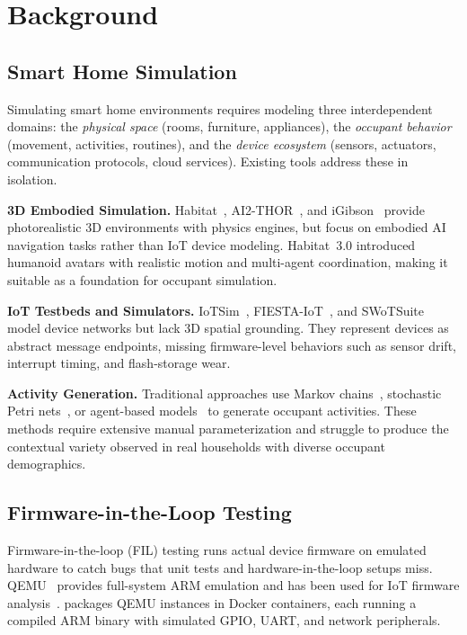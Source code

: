 \section{Background}\label{sec:background}

\subsection{Smart Home Simulation}

Simulating smart home environments requires modeling three
interdependent domains: the \emph{physical space} (rooms, furniture,
appliances), the \emph{occupant behavior} (movement, activities,
routines), and the \emph{device ecosystem} (sensors, actuators,
communication protocols, cloud services).  Existing tools address
these in isolation.

\textbf{3D Embodied Simulation.}
Habitat~\cite{habitat19iccv,habitat2,habitat3}, AI2-THOR~\cite{ai2thor},
and iGibson~\cite{igibson} provide photorealistic 3D environments with
physics engines, but focus on embodied AI navigation tasks rather
than IoT device modeling.  Habitat~3.0 introduced humanoid avatars
with realistic motion and multi-agent coordination, making it
suitable as a foundation for occupant simulation.

\textbf{IoT Testbeds and Simulators.}
IoTSim~\cite{iotsim}, FIESTA-IoT~\cite{fiesta-iot}, and SWoTSuite~\cite{swotsuite} model
device networks but lack 3D spatial grounding.  They represent devices
as abstract message endpoints, missing firmware-level behaviors such as
sensor drift, interrupt timing, and flash-storage wear.

\textbf{Activity Generation.}
Traditional approaches use Markov chains~\cite{markov-activity}, stochastic Petri
nets~\cite{petri-net-activity}, or agent-based models~\cite{abm-activity} to generate occupant
activities.  These methods require extensive manual parameterization
and struggle to produce the contextual variety observed in real
households with diverse occupant demographics.

\subsection{Firmware-in-the-Loop Testing}

Firmware-in-the-loop (FIL) testing runs actual device firmware on
emulated hardware to catch bugs that unit tests and hardware-in-the-loop
setups miss.  QEMU~\cite{qemu} provides full-system ARM emulation and has
been used for IoT firmware analysis~\cite{firmadyne,avatar}.  \sys{}
packages QEMU instances in Docker containers, each running a compiled
ARM binary with simulated GPIO, UART, and network peripherals.

